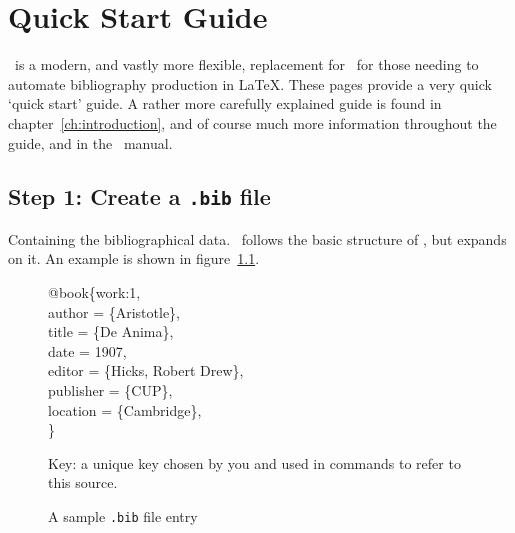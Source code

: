 \chapter{Quick Start Guide}\label{ch:quickstart}

\biblatex\ is a modern, and vastly more flexible, replacement for
\bibtex\ for those needing to automate bibliography production in
\LaTeX. These pages provide a very quick `quick start' guide. A rather
more carefully explained guide is found in
chapter~\ref{ch:introduction}, and of course much more information
throughout the guide, and in the \biblatex\ manual.

\section{Step 1: Create a \texttt{.bib} file}
Containing the bibliographical data. \biblatex\ follows the basic
structure of \bibtex, but expands on
it. An example is shown in figure~\ref{quickstart:bib}.

\begin{figure}
\strut
  \begin{minipage}[t]{0.7\linewidth}
    \ttfamily
 @book\{\colorbox{blue!15}{work:1},\\
  author       = \{Aristotle\},\\
  title        = \{De Anima\},\\
  date         = 1907,\\
  editor       = \{Hicks, Robert Drew\},\\
  publisher    = \{CUP\},\\
  location     = \{Cambridge\},\\
\}\\
\end{minipage}\begin{minipage}[t]{0.7\linewidth}
  \small\sffamily\strut\vspace{1pc}
  
   Key: a unique
key chosen by you and used in  commands to refer to this
source.
\end{minipage}
\caption{A sample \texttt{.bib} file entry}
\label{quickstart:bib}
\end{figure}

